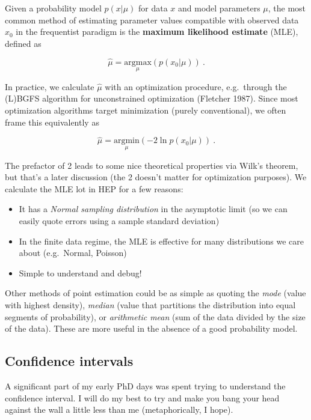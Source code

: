 \documentclass[
  11pt,
  numbers=noendperiod]{book}
\providecommand{\tightlist}{%
  \setlength{\itemsep}{0pt}\setlength{\parskip}{0pt}}\usepackage{longtable,booktabs,array}
\begin{document}
Given a probability model \(p(x|\mu)\) for data \(x\) and model
parameters \(\mu\), the most common method of estimating parameter
values compatible with observed data \(x_0\) in the frequentist paradigm
is the \textbf{maximum likelihood estimate} (MLE), defined as

\[ \hat{\mu} = \underset{\mu}{\mathrm{argmax}}(p(x_0|\mu))~.\]

In practice, we calculate \(\hat{\mu}\) with an optimization procedure,
e.g.~through the (L)BGFS algorithm for unconstrained optimization
(Fletcher 1987). Since most optimization algorithms target minimization
(purely conventional), we often frame this equivalently as

\[ \hat{\mu} = \underset{\mu}{\mathrm{argmin}} (-2\ln p(x_0|\mu))~.\]

The prefactor of 2 leads to some nice theoretical properties via Wilk's
theorem, but that's a later discussion (the 2 doesn't matter for
optimization purposes). We calculate the MLE lot in HEP for a few
reasons:

\begin{itemize}
\tightlist
\item
  It has a \emph{Normal sampling distribution} in the asymptotic limit
  (so we can easily quote errors using a sample standard deviation)
\item
  In the finite data regime, the MLE is effective for many distributions
  we care about (e.g.~Normal, Poisson)
\item
  Simple to understand and debug!
\end{itemize}

Other methods of point estimation could be as simple as quoting the
\emph{mode} (value with highest density), \emph{median} (value that
partitions the distribution into equal segments of probability), or
\emph{arithmetic mean} (sum of the data divided by the size of the
data). These are more useful in the absence of a good probability model.

\hypertarget{sec-conf-intervals}{%
\subsection{Confidence intervals}\label{sec-conf-intervals}}

A significant part of my early PhD days was spent trying to understand
the confidence interval. I will do my best to try and make you bang your
head against the wall a little less than me (metaphorically, I hope).
\end{document}
